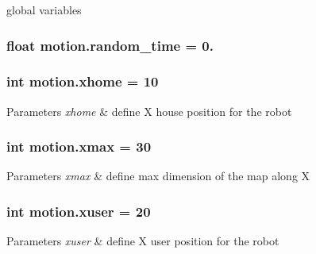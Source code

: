 global variables 

\subsubsection[{\texorpdfstring{random\+\_\+time}{random_time}}]{\setlength{\rightskip}{0pt plus 5cm}float motion.\+random\+\_\+time = 0.}\hypertarget{namespacemotion_a577a5f71c1bdf849f48eed17c4134bee}{}\label{namespacemotion_a577a5f71c1bdf849f48eed17c4134bee}
\subsubsection[{\texorpdfstring{xhome}{xhome}}]{\setlength{\rightskip}{0pt plus 5cm}int motion.\+xhome = 10}\hypertarget{namespacemotion_a8e0cdf80e6970df1d82ccd96e3f68a1a}{}\label{namespacemotion_a8e0cdf80e6970df1d82ccd96e3f68a1a}

\begin{DoxyParams}{Parameters}
{\em xhome} & define X house position for the robot \\
\hline
\end{DoxyParams}
\subsubsection[{\texorpdfstring{xmax}{xmax}}]{\setlength{\rightskip}{0pt plus 5cm}int motion.\+xmax = 30}\hypertarget{namespacemotion_ad15e7b7b1c76162401252ee7533515a4}{}\label{namespacemotion_ad15e7b7b1c76162401252ee7533515a4}

\begin{DoxyParams}{Parameters}
{\em xmax} & define max dimension of the map along X \\
\hline
\end{DoxyParams}
\subsubsection[{\texorpdfstring{xuser}{xuser}}]{\setlength{\rightskip}{0pt plus 5cm}int motion.\+xuser = 20}\hypertarget{namespacemotion_ac1191b288873954280855513ee9ed701}{}\label{namespacemotion_ac1191b288873954280855513ee9ed701}

\begin{DoxyParams}{Parameters}
{\em xuser} & define X user position for the robot \\
\hline
\end{DoxyParams}
